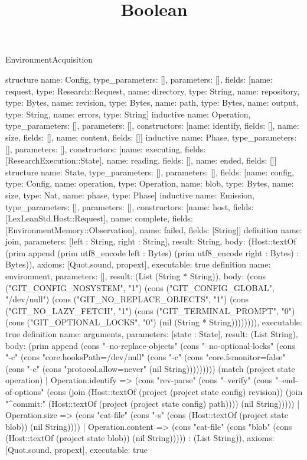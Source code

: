 \begin{lexlean}{EnvironmentAcquisition}
\title{Boolean}
\begin{semanticmodule}
structure{
 name: Config, type_parameters: [], parameters: [],
 fields: [{name: request, type: Research::Request}, {name: directory, type: String}, {name: repository, type: Bytes}, {name: revision, type: Bytes}, {name: path, type: Bytes}, {name: output, type: String}, {name: errors, type: String}]
}
inductive{
 name: Operation, type_parameters: [], parameters: [],
 constructors: [{name: identify, fields: []}, {name: size, fields: []}, {name: content, fields: []}]
}
inductive{
 name: Phase, type_parameters: [], parameters: [],
 constructors: [{name: executing, fields: [ResearchExecution::State]}, {name: reading, fields: []}, {name: ended, fields: []}]
}
structure{
 name: State, type_parameters: [], parameters: [],
 fields: [{name: config, type: Config}, {name: operation, type: Operation}, {name: blob, type: Bytes}, {name: size, type: Nat}, {name: phase, type: Phase}]
}
inductive{
 name: Emission, type_parameters: [], parameters: [],
 constructors: [{name: host, fields: [LexLeanStd.Host::Request]}, {name: complete, fields: [EnvironmentMemory::Observation]}, {name: failed, fields: [String]}]
}
definition{
 name: join, parameters: [left : String, right : String], result: String,
 body: (Host::textOf (prim append (prim utf8_encode left : Bytes) (prim utf8_encode right : Bytes) : Bytes)), axioms: [Quot.sound, propext], executable: true
}
definition{
 name: environment, parameters: [], result: (List (String * String)),
 body: (cons ("GIT_CONFIG_NOSYSTEM", "1") (cons ("GIT_CONFIG_GLOBAL", "/dev/null") (cons ("GIT_NO_REPLACE_OBJECTS", "1") (cons ("GIT_NO_LAZY_FETCH", "1") (cons ("GIT_TERMINAL_PROMPT", "0") (cons ("GIT_OPTIONAL_LOCKS", "0") (nil (String * String)))))))), executable: true
}
definition{
 name: arguments, parameters: [state : State], result: (List String),
 body: (prim append (cons "--no-replace-objects" (cons "--no-optional-locks" (cons "-c" (cons "core.hooksPath=/dev/null" (cons "-c" (cons "core.fsmonitor=false" (cons "-c" (cons "protocol.allow=never" (nil String))))))))) (match (project state operation) | Operation.identify => (cons "rev-parse" (cons "--verify" (cons "--end-of-options" (cons (join (Host::textOf (project (project state config) revision)) (join "^{commit}:" (Host::textOf (project (project state config) path)))) (nil String))))) | Operation.size => (cons "cat-file" (cons "-s" (cons (Host::textOf (project state blob)) (nil String)))) | Operation.content => (cons "cat-file" (cons "blob" (cons (Host::textOf (project state blob)) (nil String))))) : (List String)), axioms: [Quot.sound, propext], executable: true
}
\end{semanticmodule}
\end{lexlean}
